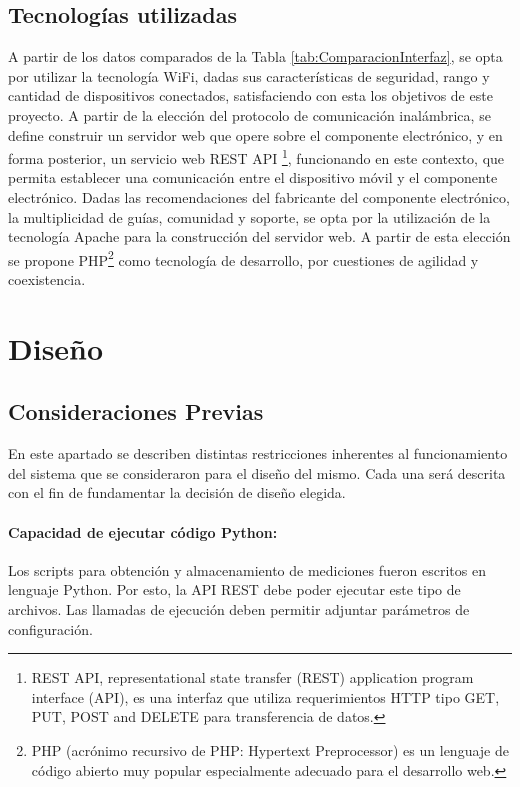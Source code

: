         \subsection{Tecnologías utilizadas}
            A partir de los datos comparados de la Tabla \ref{tab:ComparacionInterfaz}, se opta por utilizar la tecnología WiFi, dadas sus características de seguridad, rango y cantidad de dispositivos conectados, satisfaciendo con esta los objetivos de este proyecto.
            A partir de la elección del protocolo de comunicación inalámbrica, se define construir un servidor web que opere sobre el componente electrónico, y en forma posterior, un servicio web REST API \footnote{REST API, representational state transfer (REST) application program interface (API), es una interfaz que utiliza requerimientos HTTP tipo GET, PUT, POST and DELETE para transferencia de datos.}, funcionando en este contexto, que permita establecer una comunicación entre el dispositivo móvil y el componente electrónico.
            Dadas las recomendaciones del fabricante del componente electrónico, la multiplicidad de guías, comunidad y soporte, se opta por la utilización de la tecnología Apache para la construcción del servidor web. A partir de esta elección se propone PHP\footnote{PHP (acrónimo recursivo de PHP: Hypertext Preprocessor) es un lenguaje de código abierto muy popular especialmente adecuado para el desarrollo web.} como tecnología de desarrollo, por cuestiones de agilidad y coexistencia.

    
    \section{Diseño}
        
        \subsection{Consideraciones Previas}
            \par En este apartado se describen distintas restricciones inherentes al funcionamiento del sistema que se consideraron para el diseño del mismo. Cada una será descrita con el fin de fundamentar la decisión de diseño elegida.

            \paragraph{Capacidad de ejecutar código Python:}
                \par Los scripts para obtención y almacenamiento de mediciones fueron escritos en lenguaje Python. Por esto, la API REST debe poder ejecutar este tipo de archivos. Las llamadas de ejecución deben permitir adjuntar parámetros de configuración.
        
